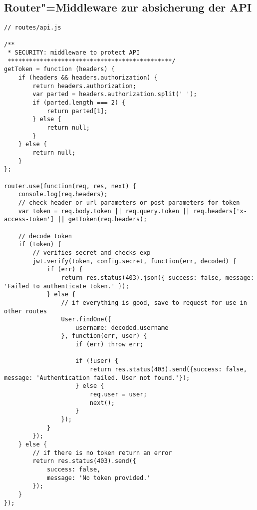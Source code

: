 \newpage
\subsection{Router"=Middleware zur absicherung der API}
\label{subsub_a2_api-security}


\begin{lstlisting}[caption={Mongoose Schema der User-Entity},label={lst_a2_model-user}, frame=single]
// routes/api.js

/**
 * SECURITY: middleware to protect API
 **********************************************/
getToken = function (headers) {
    if (headers && headers.authorization) {
        return headers.authorization;
        var parted = headers.authorization.split(' ');
        if (parted.length === 2) {
            return parted[1];
        } else {
            return null;
        }
    } else {
        return null;
    }
};

router.use(function(req, res, next) {
    console.log(req.headers);
    // check header or url parameters or post parameters for token
    var token = req.body.token || req.query.token || req.headers['x-access-token'] || getToken(req.headers);

    // decode token
    if (token) {
        // verifies secret and checks exp
        jwt.verify(token, config.secret, function(err, decoded) {
            if (err) {
                return res.status(403).json({ success: false, message: 'Failed to authenticate token.' });
            } else {
                // if everything is good, save to request for use in other routes
                User.findOne({
                    username: decoded.username
                }, function(err, user) {
                    if (err) throw err;

                    if (!user) {
                        return res.status(403).send({success: false, message: 'Authentication failed. User not found.'});
                    } else {
                        req.user = user;
                        next();
                    }
                });
            }
        });
    } else {
        // if there is no token return an error
        return res.status(403).send({
            success: false,
            message: 'No token provided.'
        });
    }
});
\end{lstlisting}
